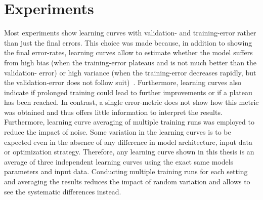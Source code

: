 \section{Experiments}

Most experiments show learning curves with validation- and training-error rather than just the final errors. This choice was made because, in addition to showing the final error-rates, learning curves allow to estimate whether the model suffers from high bias (when the training-error plateaus and is not much better than the validation-	error) or high variance (when the training-error decreases rapidly, but the validation-error does not follow suit)~\cite{ml_yearning}. Furthermore, learning curves also indicate if prolonged training could lead to further improvements or if a plateau has been reached. In contrast, a single error-metric does not show how this metric was obtained and thus offers little information to interpret the results. Furthermore, learning curve averaging of multiple training runs was employed to reduce the impact of noise. Some variation in the learning curves is to be expected even in the absence of any difference in model architecture, input data or optimization strategy. Therefore, any learning curve shown in this thesis is an average of three independent learning curves using the exact same models parameters and input data. Conducting multiple training runs for each setting and averaging the results reduces the impact of random variation and allows to see the systematic differences instead. 


